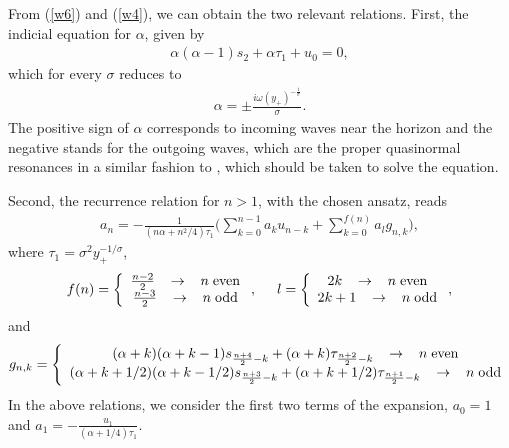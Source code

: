 \documentclass[preprint]{revtex4-1}
\def\be{\begin{eqnarray}}
\def\ee{\end{eqnarray}}
\begin{document}
From (\ref{w6}) and (\ref{w4}), we can obtain the two relevant relations. First, the indicial equation for $\alpha$, given by
\be
\label{w9}
\alpha (\alpha -1 ) s_2 + \alpha \tau_1 + u_0 = 0, 
\ee
which for every $\sigma$ reduces to  
\be
\label{w10}
\alpha = \pm \frac{i \omega (y_+)^{-\frac{1}{\sigma}}}{\sigma}.
\ee
The positive sign of $\alpha$ corresponds to incoming waves near the horizon and the negative stands for the outgoing waves, which are the proper quasinormal resonances in a similar fashion to \cite{Horowitz:1999jd}, which should be taken to solve the equation.

Second, the recurrence relation for $n>1$, with the chosen ansatz, reads
\be
\label{w11}
a_n = -\frac{1}{(n\alpha+n^2/4)\tau_1} \Bigg(\sum_{k=0}^{n-1} a_k u_{n-k} + \sum_{k=0}^{f(n)} a_l g_{n,k}\Bigg),
\ee
where $\tau_1=\sigma^2 y_+^{-1/\sigma}$,
\be
\label{w12}
f(n) =
\left\{ \begin{array}{c}
\frac{n-2}{2} \hspace{0.3cm} \rightarrow \hspace{0.3cm} n \hspace{0.1cm} \textrm{even}\\
\frac{n-3}{2} \hspace{0.3cm} \rightarrow \hspace{0.3cm} n \hspace{0.1cm} \textrm{odd}
\end{array} \right. , \hspace{0.5cm} 
l=
\left\{ \begin{array}{c}
2k \hspace{0.3cm} \rightarrow \hspace{0.3cm} n \hspace{0.1cm} \textrm{even}\\
2k+1 \hspace{0.3cm} \rightarrow \hspace{0.3cm} n \hspace{0.1cm} \textrm{odd}
\end{array} \right. ,
\ee
and
\be
g_{n,k} =
\left\{ \begin{array}{c}
(\alpha+k)(\alpha+k-1)s_{\frac{n+4}{2}-k} + (\alpha+k)\tau_{\frac{n+2}{2}-k}  \hspace{0.3cm} \rightarrow \hspace{0.3cm} n \hspace{0.1cm} \textrm{even}\\
(\alpha+k+1/2)(\alpha+k-1/2)s_{\frac{n+3}{2}-k} + (\alpha+k+1/2)\tau_{\frac{n+1}{2}-k}  \hspace{0.3cm} \rightarrow \hspace{0.3cm} n \hspace{0.1cm} \textrm{odd}
\end{array} \right. 
\label{w13}
\ee
In the above relations, we consider the first two terms of the expansion, $a_0=1$ and $a_1=-\frac{u_1}{(\alpha+1/4) \tau_1}$.
\end{document}
